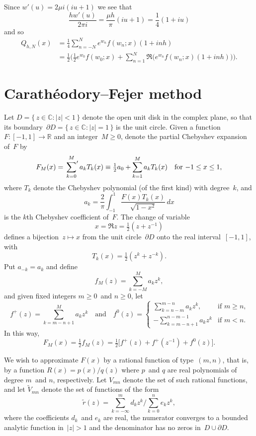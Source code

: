 \documentclass[12pt,a4paper]{article}
\begin{document}
Since $w'(u)=2\mu i(iu+1)$ we see that
\[
\frac{hw'(u)}{2\pi i}=\frac{\mu h}{\pi}(iu+1)=\frac{1}{4}(1+iu)
\]
and so
\begin{align*}
Q_{h,N}(x)&=\frac{1}{4}\sum_{n=-N}^Ne^{w_n}f(w_n;x)(1+inh)\\
    &=\frac{1}{2}\biggl(\tfrac12e^{w_0}f(w_0;x)+\sum_{n=1}^N\Re\bigl(
    e^{w_n}f(w_n;x)(1+inh)\bigr)\biggr).
\end{align*}

\section{Carath\'eodory--Fejer method}
Let $D=\{\,z\in\mathbb{C}:|z|<1\,\}$ denote the open unit disk in the complex 
plane, so that its boundary~$\partial D=\{\,z\in\mathbb{C}:|z|=1\,\}$ is the 
unit circle.  Given a function~$F:[-1,1]\to\mathbb{R}$ and an integer~$M\ge0$, 
denote the partial Chebyshev expansion of~$F$ by
\[
F_M(x)=\sideset{}{'}\sum_{k=0}^Ma_kT_k(x)
    \equiv\tfrac12 a_0+\sum_{k=1}^Ma_kT_k(x)\quad\text{for 
$-1\le x\le 1$,}
\]
where $T_k$ denote the Chebyshev polynomial (of the first kind) with degree~$k$,
and
\[
a_k=\frac{2}{\pi}\int_{-1}^1\frac{F(x)T_k(x)}{\sqrt{1-x^2}}\,dx
\]
is the $k$th Chebyshev coefficient of~$F$.  The change of variable
\[
x=\Re z=\tfrac12(z+z^{-1})
\]
defines a bijection~$z\mapsto x$ from the unit circle~$\partial D$ onto the 
real interval~$[-1,1]$, with
\[
T_k(x)=\tfrac12(z^k+z^{-k}).
\]
Put $a_{-k}=a_k$ and define
\[
f_M(z)=\sum_{k=-M}^M a_kz^k,
\]
and given fixed integers $m\ge 0$~and $n\ge0$, let
\[
f^+(z)=\sum_{k=m-n+1}^M a_kz^k\quad\text{and}\quad
f^0(z)=\begin{cases}
    \sum_{k=n-m}^{m-n}a_kz^k,&\text{if $m\ge n$,}\\
    -\sum_{k=m-n+1}^{n-m-1}a_kz^k&\text{if $m<n$.}
       \end{cases}
\]
In this way,
\begin{equation}\label{eq: FM}
F_M(x)=\tfrac12f_M(z)=\tfrac12\bigl[f^+(z)+f^+(z^{-1}) +f^0(z)\bigr].
\end{equation}

We wish to approximate $F(x)$ by a rational function of type~$(m,n)$, that is,
by a function $R(x)=p(x)/q(z)$ where $p$~and $q$ are real polynomials of degree 
$m$~and $n$, respectively.  Let $V_{mn}$ denote the set of such rational 
functions, and let $\tilde V_{mn}$ denote the set of functions of the form
\[
\tilde r(z)=\sum_{k=-\infty}^m d_kz^k\bigg/\sum_{k=0}^n e_kz^k,
\]
where the coefficients $d_k$~and $e_k$ are real, the numerator converges to 
a bounded analytic function in~$|z|>1$ and the denominator has no zeros 
in~$D\cup\partial D$.
\end{document}

